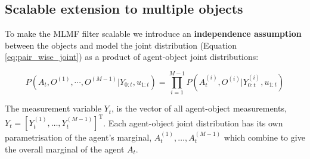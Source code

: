 
\subsection{Scalable extension to multiple objects}\label{subsec:scalabe_extension}

To make the MLMF filter scalable we introduce an \textbf{independence assumption} between the objects and model 
the joint distribution (Equation \ref{eq:pair_wise_joint}) as a product of agent-object joint distributions:

\begin{equation}\label{eq:pair_wise_joint}
 P(A_t,O^{(1)},\cdots,O^{(M-1)}|Y_{0:t},u_{1:t}) = \prod\limits_{i=1}^{M-1} P(A^{(i)}_t,O^{(i)}|Y^{(i)}_{0:t},u_{1:t})
\end{equation}

The measurement variable $Y_t$, is the vector of all agent-object 
measurements, $Y_t = \left[Y^{(1)}_t,\dots,Y^{(M-1)}_t\right]^{\mathrm{T}}$. Each agent-object joint distribution has its own parametrisation of the agent's marginal,
$A^{(1)}_t,\dots,A^{(M-1)}_t$ which combine to give the overall marginal of the agent $A_t$.


